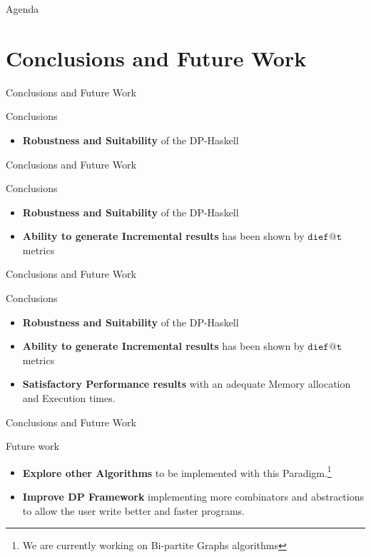 \documentclass{beamer}
\begin{document}
  \begin{frame}{Agenda}
    \section{Conclusions and Future Work}
    \tableofcontents[currentsection]
  \end{frame}

  \begin{frame}[fragile]{Conclusions and Future Work}
    \begin{block}{Conclusions}      
      \begin{itemize}
        \item \textbf{Robustness and Suitability} of the DP-Haskell 
      \end{itemize}
    \end{block}
  \end{frame}

  \begin{frame}[fragile]{Conclusions and Future Work}
    \begin{block}{Conclusions}      

    \begin{itemize}
      \item \textbf{Robustness and Suitability} of the DP-Haskell 
      \item \textbf{Ability to generate Incremental results} has been shown by $\mathtt{dief@t}$ metrics 
    \end{itemize}
  \end{block}
  \end{frame}

  \begin{frame}[fragile]{Conclusions and Future Work}
    \begin{block}{Conclusions}      

    \begin{itemize}
      \item \textbf{Robustness and Suitability} of the DP-Haskell 
      \item \textbf{Ability to generate Incremental results} has been shown by $\mathtt{dief@t}$ metrics
      \item \textbf{Satisfactory Performance results} with an adequate Memory allocation and Execution times. 
    \end{itemize}
  \end{block}
  \end{frame}

  \begin{frame}[fragile]{Conclusions and Future Work}
    \begin{block}{Future work}      
    \begin{itemize}
      \item \textbf{Explore other Algorithms} to be implemented with this Paradigm.\footnote{We are currently working on Bi-partite Graphs algorithms}
      \item \textbf{Improve DP Framework} implementing more combinators and abstractions to allow the user write better and faster programs.
    \end{itemize}
  \end{block}
  \end{frame}
\end{document}
